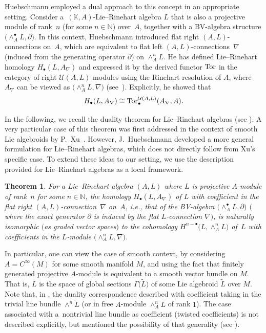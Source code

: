 \documentclass[pdftex]{sigma}
\numberwithin{equation}{section}
\newtheorem{Thm}{Theorem}[section]
\theoremstyle{definition}
\begin{document}
Huebschmann employed a dual approach to this concept in an appropriate setting. Consider a~$(\mathbb{K}, A)$-Lie--Rinehart algebra $L$ that is also a projective module of rank~$n$ (for some ${n \in \mathbb{N}}$) over~$A$, together with a BV-algebra structure $\bigl(\wedge^{\bullet}_A L, \partial\bigr)$.
 In this context, Huebschmann introduced flat right $(A, L)$-connections on~$A$, which are equivalent to flat left $(A, L)$-connections~$\nabla$ (induced from the generating operator $\partial$) on $\wedge^n_A L$.
He has defined Lie--Rinehart homology $H_{\bullet}(L, A_{\nabla})$ and expressed it by the derived functor ${\rm Tor}$ in the category of right $\mathcal{U}(A, L)$-modules using the Rinehart resolution of $A$, where $A_{\nabla}$ can be viewed as $\bigl(\wedge^n_A L, \nabla\bigr)$ (see~\cite{JH1}). Explicitly, he showed that
\[
H_{\bullet}(L, A_{\nabla}) \cong {\rm Tor}_{\bullet}^{\mathcal{U}(A, L)}(A_{\nabla}, A).
\]

In the following, we recall the duality theorem for Lie--Rinehart algebras (see \cite[Theorem~4]{JH1}). A very particular case of this theorem was first addressed in the context of smooth Lie algebroids by P.~Xu~\cite{PX}. However, J.~Huebschmann \cite{JH1, JH2} developed a more general formulation for Lie--Rinehart algebras, which does not directly follow from Xu's specific case. To extend these ideas to our setting, we use the description provided for Lie--Rinehart algebras as a local framework.
\begin{Thm} \label{duality L-R}
	For a Lie--Rinehart algebra $(A, L)$ where $L$ is projective $A$-module of rank~$n$ for some $n \in \mathbb{N}$, the homology $H_{\bullet}(L, A_{\nabla})$ of $L$ with coefficient in the flat right $(A, L)$-connec\-tion~$\nabla$ on~$A$, i.e., that of the BV-algebra $\bigl(\wedge^\bullet_{A} {L}, \partial\bigr)$ $($where the exact generator $\partial$ is induced by the flat $L$\nobreakdash-con\-nection $\nabla)$, is naturally isomorphic $($as graded vector spaces$)$ to the cohomology $H^{n-\bullet}\bigl(L, \wedge^n_{A} {L}\bigr)$ of~$L$ with coefficients in the $L$-module $\bigl(\wedge^n_{A} {L}, \nabla\bigr)$.
\end{Thm}

In particular, one can view the case of smooth context, by considering $A=C^\infty(M)$ for some smooth manifold $M$, and using the fact that finitely generated projective $A$-module is equivalent to a smooth vector bundle on $M$. That is, $L$ is the space of global sections $\Gamma\bigl(\tilde{L}\bigr)$ of some Lie algebroid $\tilde{L}$ over $M$. Note that, in \cite{PX}, the duality correspondence described with coefficient taking in the trivial line bundle $\wedge^n {\tilde{L}}$ (or in
free $A$-module $\wedge^n_{A} {L}$ of rank $1$). The case associated with a~nontrivial line bundle as coefficient (twisted coefficients) is not described explicitly, but mentioned the possibility of that generality (see \cite{AW-EL}).
\end{document}

